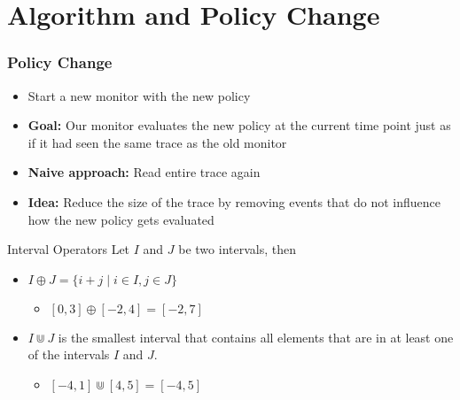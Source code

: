 \section{Algorithm and Policy Change}

\begin{frame}
    \frametitle{Policy Change}
    \begin{itemize}
        \item Start a new monitor with the new policy
        \item \textbf{Goal:} Our monitor evaluates the new policy at the current time point just as if it had seen the same trace as the old monitor
        \item \textbf{Naive approach:} Read entire trace again
        \item \textbf{Idea:} Reduce the size of the trace by removing events that do not influence how the new policy gets evaluated
    \end{itemize}
\end{frame}

\begin{frame}{Interval Operators}
    Let $I$ and $J$ be two intervals, then
    \begin{itemize}
        \item $I \oplus J = \{i+j \mid i \in I, j \in J \}$  
        \begin{itemize}
            \item $[0,3] \oplus [-2,4] = [-2,7]$
        \end{itemize}
        \item $I \Cup J$ is the smallest interval that contains all elements that are in at least one of the intervals $I$ and $J$.
        \begin{itemize}
            \item $[-4,1] \Cup [4,5] = [-4,5]$
        \end{itemize}
    \end{itemize}
    
\end{frame}


